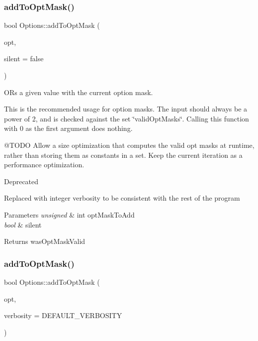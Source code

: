 \subsubsection{\texorpdfstring{addToOptMask()}{addToOptMask()}\hspace{0.1cm}{\footnotesize\ttfamily [1/2]}}
{\footnotesize\ttfamily bool Options\+::add\+To\+Opt\+Mask (\begin{DoxyParamCaption}\item[{unsigned int}]{opt,  }\item[{bool}]{silent = {\ttfamily false} }\end{DoxyParamCaption})}



OR\textquotesingle{}s a given value with the current option mask. 

This is the recommended usage for option masks. The input should always be a power of 2, and is checked against the set \char`\"{}valid\+Opt\+Masks\char`\"{}. Calling this function with 0 as the first argument does nothing.

@\+T\+O\+DO Allow a size optimization that computes the valid opt masks at runtime, rather than storing them as constants in a set. Keep the current iteration as a performance optimization.

\begin{DoxyRefDesc}{Deprecated}
\item[\mbox{\hyperlink{deprecated__deprecated000015}{Deprecated}}]Replaced with integer verbosity to be consistent with the rest of the program\end{DoxyRefDesc}



\begin{DoxyParams}{Parameters}
{\em unsigned} & int opt\+Mask\+To\+Add \\
\hline
{\em bool} & silent\\
\hline
\end{DoxyParams}
\begin{DoxyReturn}{Returns}
was\+Opt\+Mask\+Valid 
\end{DoxyReturn}
\mbox{\label{classOptions_a01faf2a904ab468235b64d58ef334349}} 
\subsubsection{\texorpdfstring{addToOptMask()}{addToOptMask()}\hspace{0.1cm}{\footnotesize\ttfamily [2/2]}}
{\footnotesize\ttfamily bool Options\+::add\+To\+Opt\+Mask (\begin{DoxyParamCaption}\item[{unsigned int}]{opt,  }\item[{unsigned int}]{verbosity = {\ttfamily DEFAULT\+\_\+VERBOSITY} }\end{DoxyParamCaption})}



